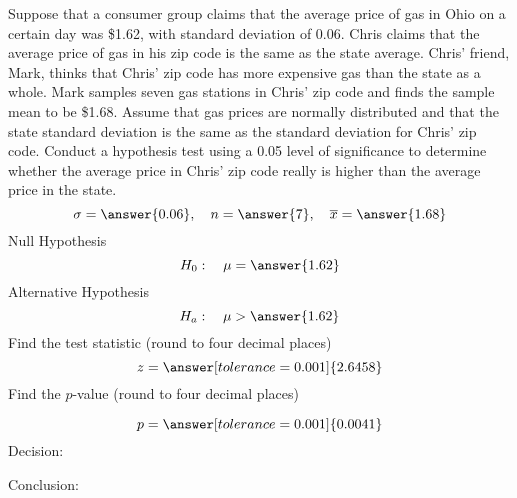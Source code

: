 \documentclass{ximera}
\begin{document}
\begin{problem}\label{prob:140hom9prob5}
Suppose that a consumer group claims that the average price of gas in Ohio on a certain day was \$1.62, with standard deviation of 0.06.  Chris claims that the average price of gas in his zip code is the same as the state average.  Chris' friend, Mark, thinks that Chris' zip code has more expensive gas than the state as a whole.  Mark samples seven gas stations in Chris' zip code and finds the sample mean to be \$1.68.  Assume that gas prices are normally distributed and that the state standard deviation is the same as the standard deviation for Chris' zip code. Conduct a hypothesis test using a 0.05 level of significance to determine whether the average price in Chris' zip code really is higher than the average price in the state.
$$\sigma=\answer{0.06},\quad n=\answer{7},\quad \overline{x}=\answer{1.68}$$
Null Hypothesis
$$H_0:\quad \mu=\answer{1.62}$$
Alternative Hypothesis
$$H_a:\quad \mu>\answer{1.62}$$
Find the test statistic (round to four decimal places)
$$z=\answer[tolerance=0.001]{2.6458}$$
Find the $p$-value (round to four decimal places)
\begin{center}  
\end{center}
$$p=\answer[tolerance=0.001]{0.0041}$$
Decision:

\begin{multipleChoice} 
\end{multipleChoice}  

Conclusion:

\begin{multipleChoice} 
\end{multipleChoice} 

\end{problem}
 
\end{document}
